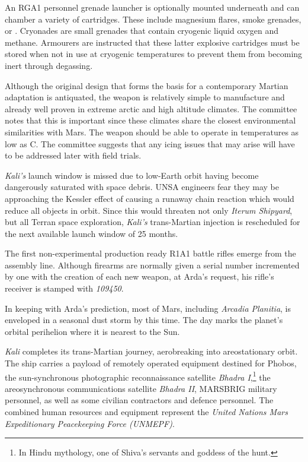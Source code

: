 An RGA1 personnel grenade launcher is optionally mounted underneath and can chamber a variety of cartridges. These include magnesium flares, smoke grenades, or . Cryonades are small grenades that contain cryogenic liquid oxygen and methane. Armourers are instructed that these latter explosive cartridges must be stored when not in use at cryogenic temperatures to prevent them from becoming inert through degassing.

Although the original design that forms the basis for a contemporary Martian adaptation is antiquated, the weapon is relatively simple to manufacture and already well proven in extreme arctic and high altitude climates. The committee notes that this is important since these climates share the closest environmental similarities with Mars. The weapon should be able to operate in temperatures as low as C. The committee suggests that any icing issues that may arise will have to be addressed later with field trials.
\StopTimelineDate

{\it Kali's} launch window is missed due to low-Earth orbit having become dangerously saturated with space debris. UNSA engineers fear they may be approaching the Kessler effect of causing a runaway chain reaction which would reduce all objects in orbit. Since this would threaten not only {\it Iterum Shipyard}, but all Terran space exploration, {\it Kali's} trans-Martian injection is rescheduled for the next available launch window of 25 months.
\StopTimelineDate

The first non-experimental production ready R1A1 battle rifles emerge from the assembly line. Although firearms are normally given a serial number incremented by one with the creation of each new weapon, at Arda's request, his rifle's receiver is stamped with {\it 109450}.
\StopTimelineDate

In keeping with Arda's prediction, most of Mars, including {\it Arcadia Planitia}, is enveloped in a seasonal dust storm by this time. The day marks the planet's orbital perihelion where it is nearest to the Sun.
\StopTimelineDate

{\it Kali} completes its trans-Martian journey, aerobreaking into areostationary orbit. The ship carries a payload of remotely operated equipment destined for Phobos, the sun-synchronous photographic reconnaissance satellite {\it Bhadra I},\footnote{In Hindu mythology, one of Shiva's servants and goddess of the hunt.} the areosynchronous communications satellite {\it Bhadra II}, MARSBRIG military personnel, as well as some civilian contractors and defence personnel. The combined human resources and equipment represent the {\it United Nations Mars Expeditionary Peacekeeping Force (UNMEPF)}.
\StopTimelineDate

